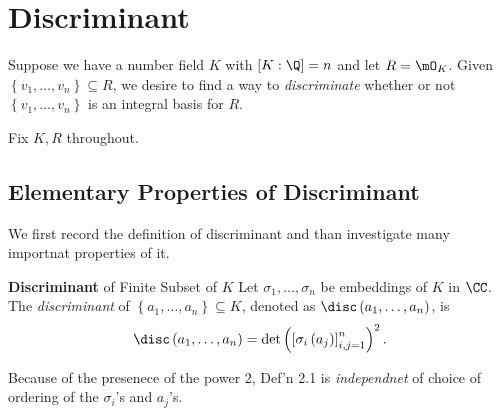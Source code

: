 \documentclass[pmath441]{subfiles}
\begin{document}
    \section{Discriminant}

    Suppose we have a number field $K$ with $\left[ K:\Q \right]=n$ and let $R=\mO_K$. Given $\left\lbrace v_1,\ldots,v_n \right\rbrace\subseteq R$, we desire to find a way to \textit{discriminate} whether or not $\left\lbrace v_1,\ldots,v_n \right\rbrace$ is an integral basis for $R$.

    Fix $K,R$ throughout.
    
    \subsection{Elementary Properties of Discriminant}

    \np We first record the definition of discriminant and than investigate many importnat properties of it.

    \begin{definition}{\textbf{Discriminant} of Finite Subset of $K$}
        Let $\sigma_1,\ldots,\sigma_n$ be embeddings of $K$ in $\CC$. The \emph{discriminant} of $\left\lbrace a_1,\ldots,a_n \right\rbrace\subseteq K$, denoted as $\disc\left( a_1,\ldots,a_n \right)$, is
        \begin{equation*}
            \disc\left( a_1,\ldots,a_n \right) = \det \left(\left[ \sigma_i\left( a_j \right) \right]^n_{i,j=1}\right)^{2}.
        \end{equation*}
    \end{definition}

    \np Because of the presenece of the power $2$, Def'n 2.1 is \textit{independnet} of choice of ordering of the $\sigma_i$'s and $a_j$'s.
\end{document}
